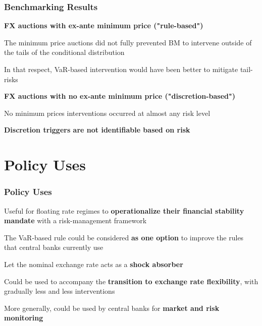 \documentclass{beamer}
\newenvironment{wideitemize}{\itemize\addtolength{\itemsep}{10pt}}{\enditemize}
\newenvironment{wideenumerate}{\enumerate\addtolength{\itemsep}{10pt}}{\endenumerate}
\begin{document}
\begin{frame}
  \frametitle{Benchmarking Results}
  \begin{wideenumerate}
  \item \textbf{FX auctions with ex-ante minimum price ("rule-based")}
  \begin{wideitemize}
    \item The minimum price auctions did not fully prevented BM to intervene
      outside of the tails of the conditional distribution
    \item In that respect, VaR-based intervention would have been better to
      mitigate tail-risks
    \end{wideitemize}
\item \textbf{FX auctions with no ex-ante minimum price ("discretion-based")}
  \begin{wideitemize}
    \item No minimum prices interventions occurred at almost any risk level
    \item \textbf{Discretion triggers are not identifiable based on risk}
    \end{wideitemize}
  \end{wideenumerate}    
\end{frame}



\section{Policy Uses}

\begin{frame}
  \frametitle{Policy Uses}
  \begin{wideitemize}
   \item Useful for floating rate regimes to \textbf{operationalize their financial
     stability mandate} with a risk-management framework
    \item The VaR-based rule could be considered \textbf{as one option} to improve the
      rules that central banks currently use
    \item Let the nominal exchange rate acts as a \textbf{shock absorber}
    \item Could be used to accompany the \textbf{transition to exchange rate
        flexibility}, with gradually less and less interventions
  \item More generally, could be used by central banks for \textbf{market and risk monitoring}
  \end{wideitemize}
\end{frame}
\end{document}
